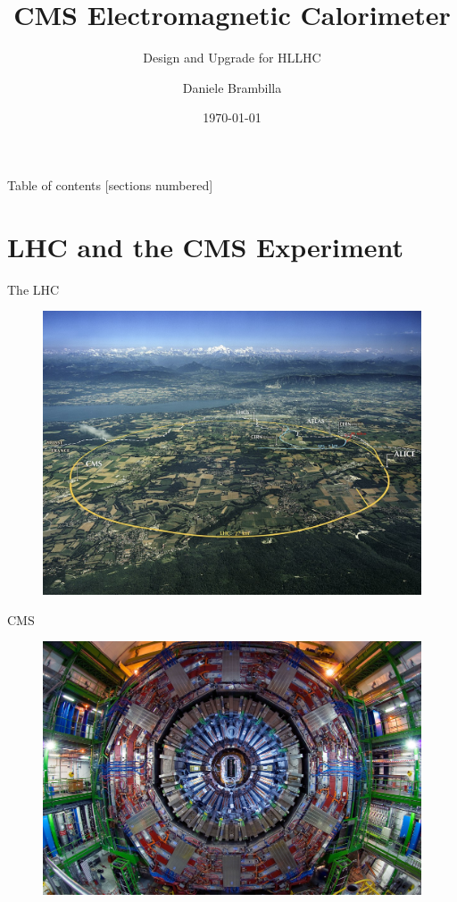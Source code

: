 \documentclass[10pt]{beamer}
\title{CMS Electromagnetic Calorimeter}
\subtitle{Design and Upgrade for HLLHC}
\date{\today}
\author{Daniele Brambilla}
\institute{University of Milano Bicocca}
\begin{document}
\maketitle

\begin{frame}{Table of contents}
  [sections numbered]
  \tableofcontents%
\end{frame}

\section[LHC and the CMS experiment]{LHC and the CMS Experiment}

\begin{frame}[fragile]{The LHC}
    \begin{figure}
        \centering
        \includegraphics[width=.85\textwidth]{./img/CERN_LHC.jpg}
    \end{figure}
\end{frame}

\begin{frame}[fragile]{CMS}
  \begin{figure}
        \centering
        \includegraphics[width=\textwidth]{./img/CMS_front.jpg}
    \end{figure}
\end{frame}
\end{document}
